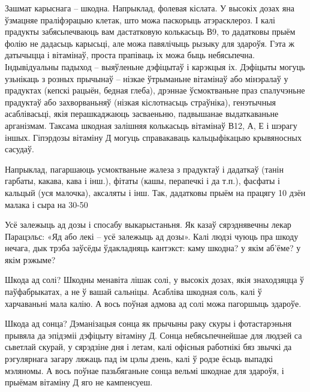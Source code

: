 Зашмат карыснага – шкодна. Напрыклад, фолевая кіслата. У высокіх дозах яна ўзмацняе праліфэрацыю клетак, што можа паскорыць атэрасклероз. І калі прадукты забясьпечваюць вам дастатковую колькасьць В9, то дадатковы прыём фолію не дадасьць карысьці, але можа павялічыць рызыку для здароўя. Гэта ж датычыцца і вітамінаў, проста прапіваць іх можа быць небясьпечна. Індывідуальны падыход – выяўленьне дэфіцытаў і карэкцыя іх. Дэфіцыты могуць узьнікаць з розных прычынаў – нізкае ўтрыманьне вітамінаў або мінэралаў у прадуктах (кепскі рацыён, бедная глеба), дрэннае ўсмоктваньне праз спалучэньне прадуктаў або захворваньняў (нізкая кіслотнасьць страўніка), генэтычныя асаблівасьці, якія перашкаджаюць засваеньню, падвышанае выдаткаваньне арганізмам. Таксама шкодная залішняя колькасьць вітамінаў В12, А, Е і шэрагу іншых. Гіпэрдозы вітаміну Д могуць справакаваць кальцыфікацыю крывяносных сасудаў.

Напрыклад, пагаршаюць усмоктваньне жалеза з прадуктаў і дадаткаў (танін гарбаты, какава, кава і інш.), фітаты (кашы, перапечкі і да т.п.), фасфаты і кальцый (уся малочка), аксаляты і інш. Так, дадатковы прыём на працягу 10 дзён малака і сыра на 30-50%

Усё залежыць ад дозы і спосабу выкарыстаньня. Як казаў сярэднявечны лекар Парацэльс: «Яд або лекі – усё залежыць ад дозы». Калі людзі чуюць пра шкоду нечага, дык трэба заўсёды ўдакладняць кантэкст: каму шкодна? у якім аб'ёме? у якім рэжыме?

Шкода ад солі? Шкодны менавіта лішак солі, у высокіх дозах, якія знаходзяцца ў паўфабрыкатах, а не ў вашай сальніцы. Асабліва шкодная соль, калі ў харчаваньні мала калію. А вось поўная адмова ад солі можа пагоршыць здароўе.

Шкода ад сонца? Дэманізацыя сонца як прычыны раку скуры і фотастарэньня прывяла да эпідэміі дэфіцыту вітаміну Д. Сонца небясьпечнейшае для людзей са сьветлай скурай, у сярэдзіне дня і летам, калі офісныя работнікі бяз звычкі да рэгулярнага загару ляжаць пад ім цэлы дзень, калі ў родзе ёсьць выпадкі мэляномы. А вось поўнае пазьбяганьне сонца вельмі шкоднае для здароўя, і прыёмам вітаміну Д яго не кампенсуеш.

